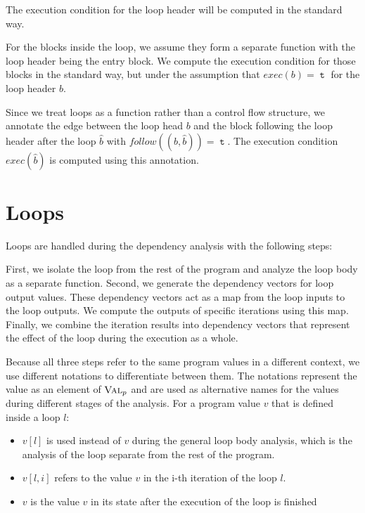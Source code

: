 The execution condition for the loop header will be computed in the standard way.

For the blocks inside the loop, we assume they form a separate function with the loop header being the entry block. We compute the execution condition for those blocks in the standard way, but under the assumption that $exec(b) = \mttt$ for the loop header $b$.

Since we treat loops as a function rather than a control flow structure, we annotate the edge between the loop head $b$ and the block following the loop header after the loop $\hat{b}$ with $follow((b, \hat{b})) = \mttt$. The execution condition $exec(\hat{b})$ is computed using this annotation.

\section{Loops}\label{sec:loops}
Loops are handled during the dependency analysis with the following steps:

First, we isolate the loop from the rest of the program and analyze the loop body as a separate function. Second, we generate the dependency vectors for loop output values. These dependency vectors act as a map from the loop inputs to the loop outputs. We compute the outputs of specific iterations using this map. Finally, we combine the iteration results into dependency vectors that represent the effect of the loop during the execution as a whole.

Because all three steps refer to the same program values in a different context, we use different notations to differentiate between them. The notations represent the value as an element of $\textsc{Val}_p$ and are used as alternative names for the values during different stages of the analysis. For a program value $v$ that is defined inside a loop $l$:
\begin{itemize}
    \setlength\itemsep{0em}
    \item $v[l]$ is used instead of $v$ during the general loop body analysis, which is the analysis of the loop separate from the rest of the program.
    \item $v[l, i]$ refers to the value $v$ in the i-th iteration of the loop $l$.
    \item $v$ is the value $v$ in its state after the execution of the loop is finished
\end{itemize}

